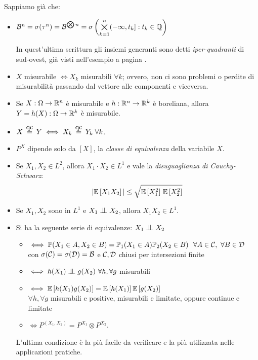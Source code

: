 Sappiamo già che:
\begin{itemize}
  \item $\mathcal B^n = \sigma(\tau^n) = \mathcal B^{\bigotimes n} = \sigma \left( \bigtimes\limits_{k = 1}^{n} (-\infty, t_k] : t_k \in \mathbb Q \right)$

    In quest'ultima scrittura gli insiemi generanti sono detti \emph{iper-quadranti} di sud-ovest, già visti nell'esempio a pagina \pageref{ese-iperquadranti}.
  \item $X$ misurabile $\iff X_k$ misurabili $\forall k$; ovvero, non ci sono problemi o perdite di misurabilità passando dal vettore alle componenti e viceversa.
  \item Se $X: \Omega \to \mathbb R^n$ è misurabile e $h: \mathbb R^n \to \mathbb R^k$ è boreliana, allora $Y = h(X): \Omega \to \mathbb R^k$ è misurabile.
  \item $X \aceq Y \iff X_k \aceq Y_k \;  \forall k$.
  \item $P^X$ dipende solo da $[X]$, la \emph{classe di equivalenza} della variabile $X$.
  \item Se $X_1, X_2 \in L^2$, allora $X_1 \cdot X_2 \in L^1$ e vale la \emph{disuguaglianza di Cauchy-Schwarz}:
  $$ | \mathbb E \left[ X_1 X_2 \right] | \leq \sqrt{\mathbb E \left[ X_1^2 \right] \, \mathbb E \left[ X_2^2 \right]}$$
  \item Se $X_1, X_2$ sono in $L^1$ e $X_1 \indep X_2$, allora $X_1 X_2 \in L^1$.
  \item Si ha la seguente serie di equivalenze: $X_1 \indep X_2$
  \begin{itemize}
    \item[] $\iff  \mathbb P(X_1 \in A, X_2 \in B) = \mathbb P_1(X_1 \in A) \mathbb P_2(X_2 \in B) \ \ \forall A \in \mathcal C, \ \forall B \in \mathcal D$ \\
        con $\sigma(\mathcal C) = \sigma(\mathcal D) = \mathcal B$ e $\mathcal C,\mathcal D$ chiusi per intersezioni finite

    \item[] $\iff h(X_1) \indep g(X_2) \ \forall h, \forall g$ misurabili

    \item[] $\iff \mathbb E \left[ h(X_1) g(X_2) \right] = \mathbb E \left[ h(X_1) \right] \mathbb E \left[ g(X_2) \right]$ \\
        $\forall h, \forall g$ misurabili e positive, misurabili e limitate, oppure continue e limitate

    \item[] $\iff P^{(X_1, X_2)} = P^{X_1} \otimes P^{X_2}$.
  \end{itemize}
  \begin{nb}
    L'ultima condizione è la più facile da verificare e la più utilizzata nelle applicazioni pratiche.
  \end{nb}
\end{itemize}

